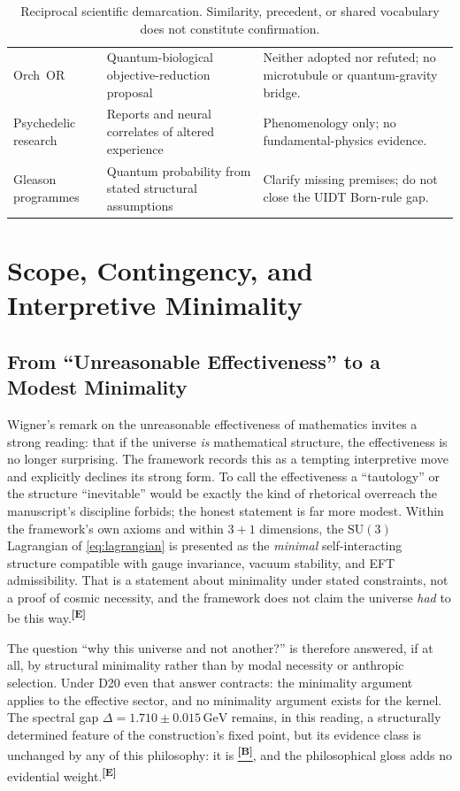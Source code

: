 \documentclass[12pt,a4paper,twoside]{article}
\theoremstyle{plain}
\theoremstyle{definition}
\theoremstyle{remark}
\newcommand{\GeV}{\,\mathrm{GeV}}
\newcommand{\catmark}[1]{\textsuperscript{\textsf{\textbf{[#1]}}}}
\newcommand{\Bdelta}{\hyperref[box:pi-override-delta]{\catmark{B}}}
\newcommand{\DeltaGap}{1.710 \pm 0.015\GeV} %
\begin{document}
\begin{table}[H]
\begin{tabular}{@{}p{}p{}p{}@{}}
Orch~OR & Quantum-biological objective-reduction proposal &
Neither adopted nor refuted; no microtubule or quantum-gravity bridge.\\
Psychedelic research & Reports and neural correlates of altered experience &
Phenomenology only; no fundamental-physics evidence.\\
Gleason programmes & Quantum probability from stated structural assumptions &
Clarify missing premises; do not close the UIDT Born-rule gap.\\
\bottomrule
\end{tabular}
\caption{Reciprocal scientific demarcation. Similarity, precedent, or shared
vocabulary does not constitute confirmation.}
\label{tab:ctx-reciprocal-demarcation}
\end{table}

\section{Scope, Contingency, and Interpretive Minimality}
\label{sec:inevitability-sociology}

\subsection{From ``Unreasonable Effectiveness'' to a Modest Minimality}
\label{subsec:inevitability}

Wigner's remark on the unreasonable effectiveness of mathematics invites
a strong reading: that if the universe \emph{is} mathematical structure,
the effectiveness is no longer surprising. The framework records this as
a tempting interpretive move and explicitly declines its strong form. To
call the effectiveness a ``tautology'' or the structure ``inevitable''
would be exactly the kind of rhetorical overreach the manuscript's
discipline forbids; the honest statement is far more modest. Within the
framework's own axioms and within $3+1$ dimensions, the $\mathrm{SU}(3)$
Lagrangian of \cref{eq:lagrangian} is presented as the \emph{minimal}
self-interacting structure compatible with gauge invariance, vacuum
stability, and EFT admissibility. That is a statement about minimality
under stated constraints, not a proof of cosmic necessity, and the
framework does not claim the universe \emph{had} to be this
way.\catmark{E}

The question ``why this universe and not another?'' is therefore
answered, if at all, by structural minimality rather than by modal
necessity or anthropic selection. Under D20 even that answer contracts:
the minimality argument applies to the effective sector, and no
minimality argument exists for the kernel. The spectral gap
$\Delta = \DeltaGap$ remains, in this reading, a structurally determined
feature of the construction's fixed point, but its evidence class is
unchanged by any of this philosophy: it is \Bdelta, and the philosophical
gloss adds no evidential weight.\catmark{E}
\end{document}
